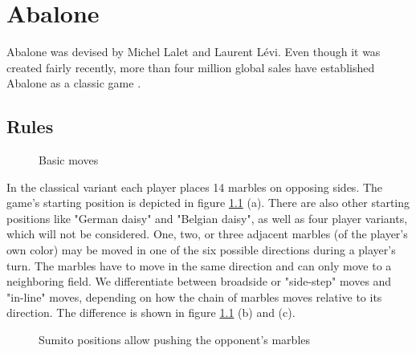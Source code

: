 \chapter{Abalone}
\label{abalone}
Abalone was devised by Michel Lalet and Laurent Lévi. Even though it was created fairly recently, more than four million global sales have established Abalone as a classic game \cite{noauthor_abalone_2020}.

\section{Rules}

\begin{figure}[!h]
    \centering
    \hfill
    \hfill
    \caption{Basic moves \cite{abalone_sa_abalone_nodate}}
    \label{basics}
\end{figure}

In the classical variant each player places 14 marbles on opposing sides. The game's starting position is depicted in figure \ref{basics} (a). There are also other starting positions like "German daisy" and "Belgian daisy", as well as four player variants, which will not be considered. One, two, or three adjacent marbles (of the player's own color) may be moved in one of the six possible directions during a player's turn. The marbles have to move in the same direction and can only move to a neighboring field. We differentiate between broadside or "side-step" moves and "in-line" moves, depending on how the chain of marbles moves relative to its direction. The difference is shown in figure \ref{basics} (b) and (c).

\begin{figure}[!h]
    \centering
    \hfill
    \hfill
    \caption{Sumito positions allow pushing the opponent's marbles \cite{abalone_sa_abalone_nodate}}
    \label{sumito}
\end{figure}

